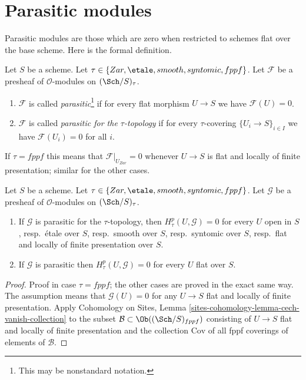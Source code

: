\section{Parasitic modules}
\label{section-parasitic}

\noindent
Parasitic modules are those which are zero when restricted
to schemes flat over the base scheme. Here is the formal definition.

\begin{definition}
\label{definition-parasitic}
Let $S$ be a scheme. Let $\tau \in \{Zar, \etale,
smooth, syntomic, fppf\}$. Let $\mathcal{F}$ be a presheaf
of $\mathcal{O}$-modules on $(\Sch/S)_\tau$.
\begin{enumerate}
\item $\mathcal{F}$ is called
{\it parasitic}\footnote{This may be nonstandard notation.}
if for every flat morphism $U \to S$ we have $\mathcal{F}(U) = 0$.
\item $\mathcal{F}$ is called {\it parasitic for the $\tau$-topology}
if for every $\tau$-covering $\{U_i \to S\}_{i \in I}$ we have
$\mathcal{F}(U_i) = 0$ for all $i$.
\end{enumerate}
\end{definition}

\noindent
If $\tau = fppf$ this means that $\mathcal{F}|_{U_{Zar}} = 0$ whenever
$U \to S$ is flat and locally of finite presentation; similar for
the other cases.

\begin{lemma}
\label{lemma-cohomology-parasitic}
Let $S$ be a scheme. Let $\tau \in \{Zar, \etale, smooth,
syntomic, fppf\}$. Let $\mathcal{G}$ be a presheaf of
$\mathcal{O}$-modules on $(\Sch/S)_\tau$.
\begin{enumerate}
\item If $\mathcal{G}$ is parasitic for the $\tau$-topology, then
$H^p_\tau(U, \mathcal{G}) = 0$ for every $U$ open in $S$,
resp.\ \'etale over $S$,
resp.\ smooth over $S$,
resp.\ syntomic over $S$,
resp.\ flat and locally of finite presentation over $S$.
\item If $\mathcal{G}$ is parasitic then $H^p_\tau(U, \mathcal{G}) = 0$
for every $U$ flat over $S$.
\end{enumerate}
\end{lemma}

\begin{proof}
Proof in case $\tau = fppf$; the other cases are proved in the
exact same way. The assumption means that $\mathcal{G}(U) = 0$ for any
$U \to S$ flat and locally of finite presentation. Apply
Cohomology on Sites, Lemma \ref{sites-cohomology-lemma-cech-vanish-collection}
to the subset $\mathcal{B} \subset \Ob((\Sch/S)_{fppf})$ consisting
of $U \to S$ flat and locally of finite presentation and the collection
$\text{Cov}$ of all fppf coverings of elements of $\mathcal{B}$.
\end{proof}

